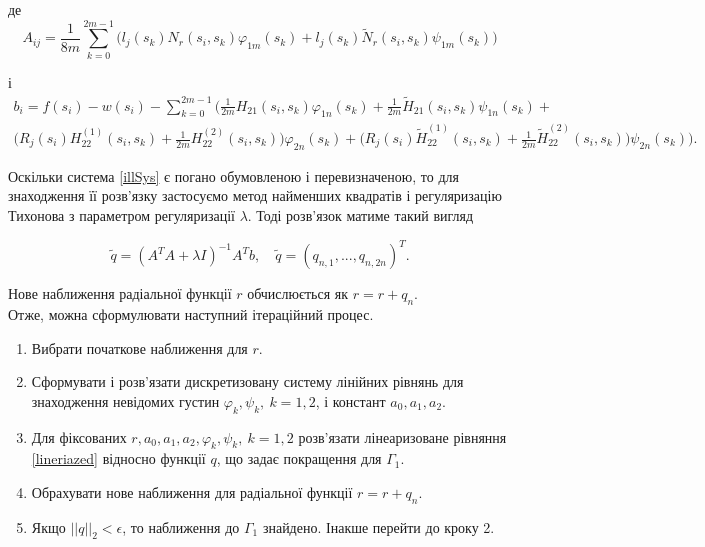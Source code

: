 \documentclass[12pt]{report}
\begin{document}
 де
 \begin{equation}
A_{ij}=\frac{1}{8m}\sum_{k=0}^{2m-1}\Big(l_{j}(s_k)N_r(s_i,s_k)\varphi_{1m}(s_k)+l_{j}(s_k)\tilde{N}_r(s_i,s_k)\psi_{1m}(s_k)\Big) \nonumber
 \end{equation} 
 
 і 
 \begin{equation}
 \begin{multlined}
 b_i=f(s_i)-w(s_i)-\sum_{k=0}^{2m-1}\Big(\frac{1}{2m}H_{21}(s_i,s_k)\varphi_{1n}(s_k)+\frac{1}{2m}\tilde{H}_{21}(s_i,s_k)\psi_{1n}(s_k)+\\\big(R_j(s_i)H_{22}^{(1)}(s_i,s_k)+\frac{1}{2m}H_{22}^{(2)}(s_i,s_k)\big)\varphi_{2n}(s_k)+\big(R_j(s_i)\tilde{H}_{22}^{(1)}(s_i,s_k)+\frac{1}{2m}\tilde{H}_{22}^{(2)}(s_i,s_k)\big)\psi_{2n}(s_k)\Big). \nonumber
 \end{multlined}
 \end{equation} 
 
 Оскільки система \eqref{illSys} є погано обумовленою і перевизначеною, то для знаходження її розв'язку застосуємо метод найменших квадратів і регуляризацію Тихонова з параметром регуляризації $\lambda$. Тоді розв'язок матиме такий вигляд
 
 \begin{equation}
\tilde{q}=(A^T A+\lambda I)^{-1}A^T b, \quad \tilde{q}=(q_{n,1}, ..., q_{n,2n})^T.
 \end{equation} 
 
 Нове наближення радіальної функції $r$ обчислюється як $r=r+q_n$.
 \\
 
 Отже, можна сформулювати наступний ітераційний процес.
\begin{enumerate}
  \item Вибрати початкове наближення для $r$.
  \item Сформувати і розв'язати дискретизовану систему лінійних рівнянь для знаходження невідомих густин $\varphi_k,\psi_k, \ k=1,2$, і констант $a_0,a_1, a_2$.
  \item Для фіксованих $r, a_0,a_1, a_2, \varphi_k,\psi_k, \ k=1,2$ розв'язати лінеаризоване рівняння \eqref{lineriazed} відносно функції $q$, що задає покращення для $\Gamma_1$.
  \item Обрахувати нове наближення для радіальної функції $r=r+q_n$.
  \item Якщо $||q||_2<\epsilon$, то наближення до $\Gamma_1$ знайдено. Інакше перейти до кроку 2.
\end{enumerate}
\end{document}
